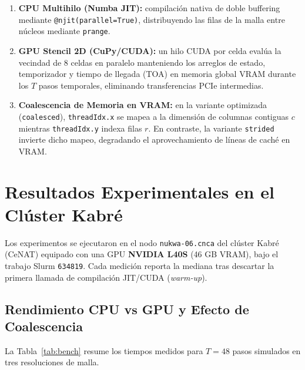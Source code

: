 \documentclass[twocolumn,10pt]{article}
\begin{document}
\begin{enumerate}
    \item \textbf{CPU Multihilo (Numba JIT):} compilación nativa de doble buffering mediante \texttt{@njit(parallel=True)}, distribuyendo las filas de la malla entre núcleos mediante \texttt{prange}.
    \item \textbf{GPU Stencil 2D (CuPy/CUDA):} un hilo CUDA por celda evalúa la vecindad de 8 celdas en paralelo manteniendo los arreglos de estado, temporizador y tiempo de llegada (TOA) en memoria global VRAM durante los $T$ pasos temporales, eliminando transferencias PCIe intermedias.
    \item \textbf{Coalescencia de Memoria en VRAM:} en la variante optimizada (\texttt{coalesced}), \texttt{threadIdx.x} se mapea a la dimensión de columnas contiguas $c$ mientras \texttt{threadIdx.y} indexa filas $r$. En contraste, la variante \texttt{strided} invierte dicho mapeo, degradando el aprovechamiento de líneas de caché en VRAM.
\end{enumerate}

\section{Resultados Experimentales en el Clúster Kabré}

Los experimentos se ejecutaron en el nodo \texttt{nukwa-06.cnca} del clúster Kabré (CeNAT) equipado con una GPU \textbf{NVIDIA L40S} (46 GB VRAM), bajo el trabajo Slurm \texttt{634819}. Cada medición reporta la mediana tras descartar la primera llamada de compilación JIT/CUDA (\textit{warm-up}).

\subsection{Rendimiento CPU vs GPU y Efecto de Coalescencia}

La Tabla~\ref{tab:bench} resume los tiempos medidos para $T = 48$ pasos simulados en tres resoluciones de malla.
\end{document}
